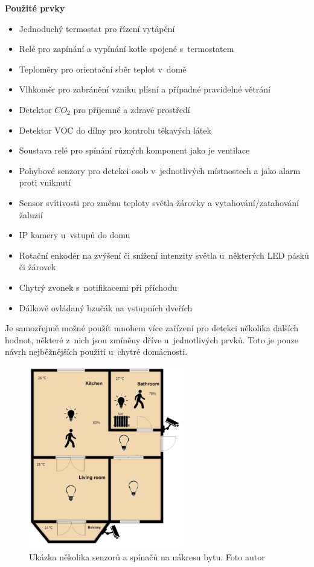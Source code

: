 \noindent\textbf{Použité prvky}
\begin{itemize}
  \item Jednoduchý termostat pro řízení vytápění
  \item Relé pro zapínání a vypínání kotle spojené s~termostatem
  \item Teploměry pro orientační sběr teplot v~domě
  \item Vlhkoměr pro zabránění vzniku plísní a případné pravidelné větrání
  \item Detektor $CO_2$ pro příjemné a zdravé prostředí
  \item Detektor VOC do dílny pro kontrolu těkavých látek
  \item Soustava relé pro spínání různých komponent jako je ventilace
  \item Pohybové senzory pro detekci osob v~jednotlivých místnostech a jako alarm proti vniknutí
  \item Sensor svítivosti pro změnu teploty světla žárovky a vytahování/zatahování žaluzií
  \item IP kamery u~vstupů do domu
  \item Rotační enkodér na zvýšení či snížení intenzity světla u~některých LED pásků či žárovek
  \item Chytrý zvonek s~notifikacemi při příchodu
  \item Dálkově ovládaný bzučák na vstupních dveřích  
  \end{itemize}

Je samozřejmě možné použít mnohem více zařízení pro detekci několika dalších hodnot, některé z~nich jsou zmíněny dříve u~jednotlivých prvků. Toto je pouze návrh nejběžnějších použití u~chytré domácnosti.

\begin{figure}[H]
  \centering
  \includegraphics[width=0.6\textwidth]{obrazky-figures/hardwareUsage/homeDiagramExample.png}
  \caption{Ukázka několika senzorů a spínačů na nákresu bytu. Foto autor}
  \label{houseDiagram}
\end{figure}

